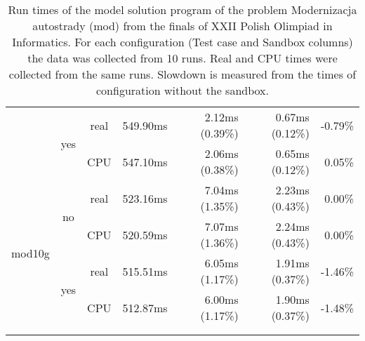 \documentclass[en]{pracamgr}
\begin{document}
\begin{appendices}
\begin{small}
\begin{longtable}{|l|c|c|r|r|r|r|}
                          \cline{2-7}
                          & \multirow{2}{*}{yes} & real & 549.90ms & 2.12ms (0.39\%) & 0.67ms (0.12\%) & -0.79\% \\*
                          &                      & CPU  & 547.10ms & 2.06ms (0.38\%) & 0.65ms (0.12\%) & 0.05\% \\
\hline
\multirow{4}{*}{mod10g}   & \multirow{2}{*}{no}  & real & 523.16ms & 7.04ms (1.35\%) & 2.23ms (0.43\%) & 0.00\% \\*
                          &                      & CPU  & 520.59ms & 7.07ms (1.36\%) & 2.24ms (0.43\%) & 0.00\% \\*
                          \cline{2-7}
                          & \multirow{2}{*}{yes} & real & 515.51ms & 6.05ms (1.17\%) & 1.91ms (0.37\%) & -1.46\% \\*
                          &                      & CPU  & 512.87ms & 6.00ms (1.17\%) & 1.90ms (0.37\%) & -1.48\% \\
\hline
\multicolumn{1}{c}{}\\ %
\caption{Run times of the model solution program of the problem Modernizacja autostrady (mod) from the finals of XXII Polish Olimpiad in Informatics. For each configuration (Test case and Sandbox columns) the data was collected from 10 runs. Real and CPU times were collected from the same runs. Slowdown is measured from the times of configuration without the sandbox.}
\label{table:mod_model_solution_runtimes}
\end{longtable}
\end{small}


\end{appendices}
\end{document}

